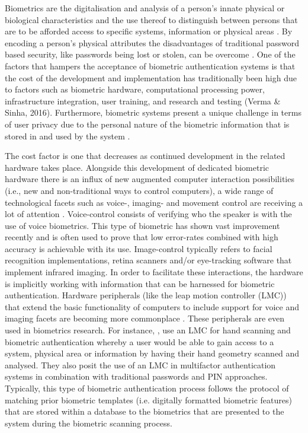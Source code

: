 Biometrics are the digitalisation and analysis of a person’s innate physical or biological characteristics and the use thereof to distinguish between persons that are to be afforded access to specific systems, information or physical areas \citep{Rathgeb2011}. By encoding a person’s physical attributes the disadvantages of traditional password based security, like passwords being lost or stolen, can be overcome \citep{Verma2016}. One of the factors that hampers the acceptance of biometric authentication systems is that the cost of the development and implementation has traditionally been high due to factors such as biometric hardware, computational processing power, infrastructure integration, user training, and research and testing (Verma \& Sinha, 2016). Furthermore, biometric systems present a unique challenge in terms of user privacy due to the personal nature of the biometric information that is stored in and used by the system \citep{Paul2012}.

The cost factor is one that decreases as continued development in the related hardware takes place. Alongside this development of dedicated biometric hardware there is an influx of new augmented computer interaction possibilities (i.e., new and non-traditional ways to control computers), a wide range of technological facets such as voice-, imaging- and movement control are receiving a lot of attention \citep{Paul2012, Verma2016}. Voice-control consists of verifying who the speaker is with the use of voice biometrics. This type of biometric has shown vast improvement recently and is often used to prove that low error-rates combined with high accuracy is achievable with its use. Image-control typically refers to facial recognition implementations, retina scanners and/or eye-tracking software that implement infrared imaging. In order to facilitate these interactions, the hardware is implicitly working with information that can be harnessed for biometric authentication. Hardware peripherals (like the leap motion controller (LMC)) that extend the basic functionality of computers to include support for voice and imaging facets are becoming more commonplace \citep{Rathgeb2011}. These peripherals are even used in biometrics research. For instance, \cite{Chan2015}, use an LMC for hand scanning and biometric authentication whereby a user would be able to gain access to a system, physical area or information by having their hand geometry scanned and analysed. They also posit the use of an LMC in multifactor authentication systems in combination with traditional passwords and PIN approaches. 
Typically, this type of biometric authentication process follows the protocol of matching prior biometric templates (i.e. digitally formatted biometric features) that are stored within a database to the biometrics that are presented to the system during the biometric scanning process. 

